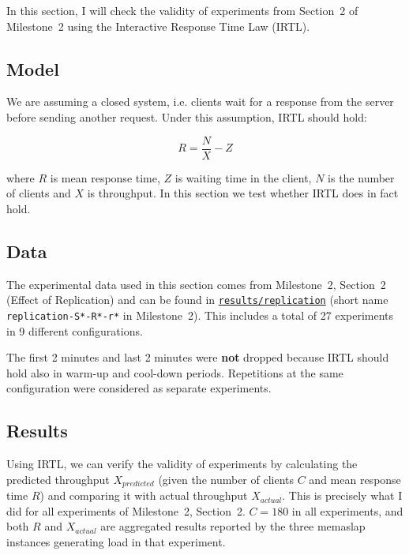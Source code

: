 \documentclass[11pt]{article}
\begin{document}
In this section, I will check the validity of experiments from Section~2 of Milestone~2 using the Interactive Response Time Law (IRTL).

\subsection{Model}

We are assuming a closed system, i.e. clients wait for a response from the server before sending another request. Under this assumption, IRTL should hold:

$$R = \frac{N}{X} - Z$$

where $R$ is mean response time, $Z$ is waiting time in the client, $N$ is the number of clients and $X$ is throughput. In this section we test whether IRTL does in fact hold.

\subsection{Data}

The experimental data used in this section comes from Milestone~2, Section~2 (Effect of Replication) and can be found in \texttt{\href{https://gitlab.inf.ethz.ch/pungast/asl-fall16-project/tree/master/results/replication}{results/replication}} (short name \texttt{replication-S*-R*-r*} in Milestone~2). This includes a total of 27 experiments in 9 different configurations.

The first 2 minutes and last 2 minutes were \textbf{not} dropped because IRTL should hold also in warm-up and cool-down periods. Repetitions at the same configuration were considered as separate experiments.

\subsection{Results}

Using IRTL, we can verify the validity of experiments by calculating the predicted throughput $X_{predicted}$ (given the number of clients $C$ and mean response time $R$) and comparing it with actual throughput $X_{actual}$. This is precisely what I did for all experiments of Milestone~2, Section~2. $C=180$ in all experiments, and both $R$ and $X_{actual}$ are aggregated results reported by the three memaslap instances generating load in that experiment.
\end{document}
